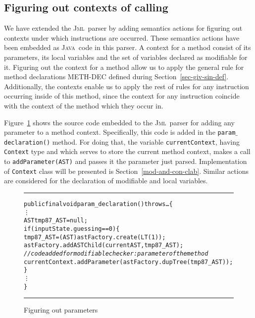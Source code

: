 \documentclass[a4paper]{llncs}
\newcommand{\jml}{\textsc{Jml}}
\newcommand{\java}{\textsc{Java}}
\begin{document}
\subsection{Figuring out contexts of calling}
\label{fig-out-met-cal-con}
We have extended the \jml~parser by adding semantics actions for
figuring out contexts under which instructions are occurred. These
semantics actions have been embedded as \java~code in this parser. A
context for a method consist of its parameters, its local variables
and the set of variables declared as modifiable for it. Figuring out
the context for a method allow us to apply the general rule for method
declarations \textup{METH-DEC} defined during
Section~\ref{sec-giv-sin-def}. Additionally, the contexts enable us to
apply the rest of rules
for any instruction occurring inside of this method, since the context
for any instruction coincide with the context of the method which they
occur in.

Figure~\ref{fig-out-par} shows the source code embedded to the
\jml~parser for adding any parameter to a method
context. Specifically, this code is added in the
\texttt{param$\_$declaration()} method. For doing that, the variable
\texttt{currentContext}, having \texttt{Context} type and which serves
to store the current method context, makes a call to
\texttt{addParameter(AST)} and passes it the parameter just
parsed. Implementation of \texttt{Context} class will be presented is
Section~\ref{mod-and-con-clab}. Similar actions are
considered for the declaration of modifiable and local variables.
\begin{figure}[tbh]
\rule{\linewidth}{0.25mm}
\begin{alltt}
   public final void param_declaration() throws \dots \verb!{! 
      \vdots
      AST tmp87_AST = null;
      if(inputState.guessing == 0) \verb!{!
         tmp87_AST = (AST)astFactory.create(LT(1));
         astFactory.addASTChild(currentAST, tmp87_AST);
         {\it//code added for modifiable checker: parameter of the method}
         currentContext.addParameter(astFactory.dupTree(tmp87_AST));
      \verb!}!
      \vdots
   \verb!}!
\end{alltt}
\caption{Figuring out parameters}
\label{fig-out-par}
\rule{\linewidth}{0.25mm}
\end{figure}
\end{document}
